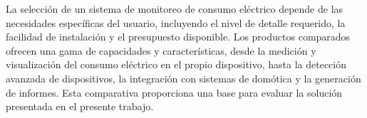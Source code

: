 La selección de un sistema de monitoreo de consumo eléctrico depende de las necesidades específicas del usuario, incluyendo el nivel de detalle requerido, la facilidad de instalación y el presupuesto disponible. Los productos comparados ofrecen una gama de capacidades y características, desde la medición y visualización del consumo eléctrico en el propio dispositivo, hasta la detección avanzada de dispositivos, la integración con sistemas de domótica y la generación de informes. Esta comparativa proporciona una base para evaluar la solución presentada en el presente trabajo.

